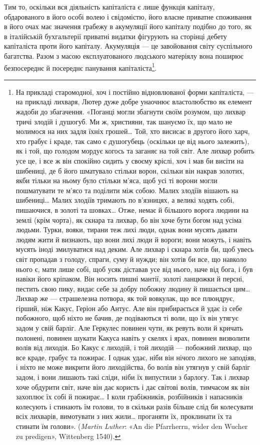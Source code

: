 Тим то, оскільки вся діяльність капіталіста є лише функція
капіталу, обдарованого в його особі волею і свідомістю, його
власне приватне споживання в його очах має значення грабежу
в акумуляції його капіталу подібно до того, як в італійській
бухгальтерії приватні видатки фігурують на сторінці дебету
капіталіста проти його капіталу. Акумуляція — це завойовання
світу суспільного багатства. Разом з масою експлуатованого людського
матеріялу вона поширює безпосереднє й посереднє панування
капіталіста\footnote{
На прикладі старомодної, хоч і постійно відновлюваної форми
капіталіста, — на прикладі лихваря, Лютер дуже добре унаочнює властолюбство
як елемент жадоби до збагачення. «Поганці могли збагнути
своїм розумом, що лихвар тричі злодій і душогуб. Ми ж, християни, так
шануємо їх, що мало не молимося на них задля їхніх грошей\dots{} Той, хто
висисає в другого його харч, хто грабує і краде, так само є душогубець
(оскільки це від нього залежить), як і той, що голодом мордує когось
та заганяє на той світ. Але лихвар робить усе це, і все ж він спокійно
сидить у своєму кріслі, хоч і мав би висіти на шибениці, де б його шматувало
стільки ворон, скільки він накрав золотих, якби тільки на ньому
було стільки м’яса, щоб усі ті ворони могли пошматувати те м’ясо та
поділити між собою. Малих злодіїв вішають на шибениці\dots{} Малих злодіїв
тримають по в’язницях, а великі ходять собі, пишаючися, в золоті
та шовках\dots{} Отже, немає й більшого ворога людини на землі (крім чорта),
як скнара та лихвар, бо він хоче бути богом над усіма людьми. Турки,
вояки, тирани теж лихі люди, однак вони мусять давати людям жити й
визнають, що вони лихі люди й вороги; вони можуть, і навіть мусять
іноді змилуватися над деким. Але лихвар і скнара хотів би, щоб увесь
світ пропадав з голоду, спраги, суму й нужди; він хотів би все, що навколо
нього є, мати лише собі, щоб усяк діставав усе від нього, наче від бога,
і був навіки його кріпаком. Він носить пишні мантії, золоті ланцюжки
й персні, пестить свою пику, видає себе за добру побожну людину
й пишається цим\dots{} Лихвар же — страшелезна потвора, як той вовкулак,
що все плюндрує, гірший, ніж Какус, Геріон або Антус. Але він
прибирається й удає із себе побожного, щоб ніхто не бачив, де подіваються
ті воли, що їх він утягує задом у свій барліг. Але Геркулес повинен
чути, як ревуть воли й кричать полонені, повинен шукати Какуса навіть
у скелях і ярах, повинен визволити волів від лиходія. Бо Какус є лиходій,
і той лиходій — побожний лихвар, що все краде, грабує та пожирає.
І однак удає, ніби він нічого лихого не заподіяв, і ніхто не може викрити
його лиходійства, бо волів він утягнув у свій барліг задом, і вони лишають
такі сліди, ніби їх випустили з барлогу. Так і лихвар хоче обдурити
світ, наче він дає користь і дає світові волів, тимчасом як він
захоплює їх собі й пожирає\dots{} І коли грабіжників, розбійників і напасників
колесують і стинають їм голови, то в скільки разів більше слід
би колесувати всіх лихварів, вимотувати з них жили\dots{} проганяти їх,
проклинати їх та стинати їм голови». (\emph{Martin Luther}: «An die Pfarrherrn,
wider den Wucher zu predigen», Wittenberg 1540).
}.

